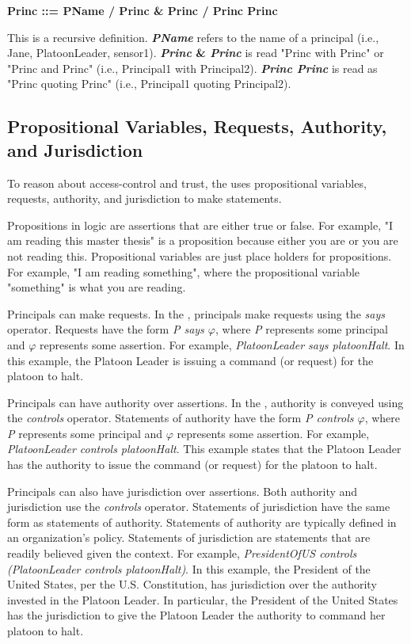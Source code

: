 \documentclass[../../main/main.tex]{subfiles}
\begin{document}
\begin{center}
\textbf{Princ ::= PName / Princ \& Princ / Princ \textbar  Princ}
\end{center}

This is a recursive definition. \textbf{\textit{PName}} refers to the name of a principal (i.e., Jane, PlatoonLeader, sensor1).  \textbf{\textit{Princ} \& \textit{Princ}} is read "Princ with Princ" or "Princ and Princ" (i.e., Principal1 with Principal2). \textbf{\textit{Princ \textbar  Princ}} is read as "Princ quoting Princ" (i.e., Principal1 quoting Principal2).


\subsection{Propositional Variables, Requests, Authority, and Jurisdiction}\label{ssec:statementsacl}
To reason about access-control and trust, the  uses propositional variables, requests, authority, and jurisdiction to make statements.

Propositions in logic are assertions that are either true or false.  For example, "I am reading this master thesis" is a proposition because either you are or you are not reading this.  Propositional variables are just place holders for propositions.  For example, "I am reading something", where the propositional variable "something" is what you are reading.

Principals can make requests.  In the , principals make requests using the \textit{says} operator.  Requests have the form \textit{P says $\varphi$},  where \textit{P} represents some principal and \textit{$\varphi$} represents some assertion.  For example, \textit{PlatoonLeader says platoonHalt}.  In this example, the Platoon Leader is issuing a command (or request) for the platoon to halt.  

Principals can have authority over assertions.  In the , authority is conveyed using the \textit{controls} operator.  Statements of authority have the form \textit{P controls $\varphi$},  where \textit{P} represents some principal and \textit{$\varphi$} represents some assertion.  For example, \textit{PlatoonLeader controls platoonHalt}.  This example states that the Platoon Leader has the authority to issue the command (or request) for the platoon to halt. 

Principals can also have jurisdiction over assertions.  Both authority and jurisdiction use the \textit{controls} operator.  Statements of jurisdiction have the same form as statements of authority.  Statements of authority are typically defined in an organization's policy.  Statements of jurisdiction are statements that are readily believed given the context.  For example, \textit{PresidentOfUS controls (PlatoonLeader controls platoonHalt)}.  In this example, the President of the United States, per the U.S. Constitution, has jurisdiction over the authority invested in the Platoon Leader.  In particular, the President of the United States has the jurisdiction to give the Platoon Leader the authority to command her platoon to halt.
\end{document}
